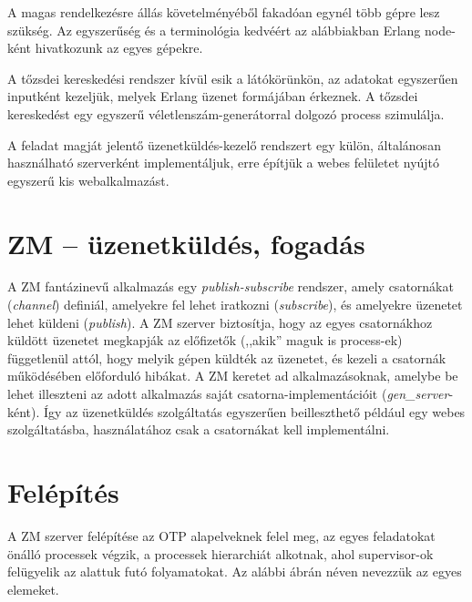 \documentclass[12pt, a4paper, oneside]{book}
\begin{document}
A magas rendelkezésre állás követelményéből fakadóan egynél több gépre lesz
szükség. Az egyszerűség és a terminológia kedvéért az alábbiakban Erlang
node-ként hivatkozunk az egyes gépekre.

A tőzsdei kereskedési rendszer kívül esik a látókörünkön, az adatokat
egyszerűen inputként kezeljük, melyek Erlang üzenet formájában érkeznek. A
tőzsdei kereskedést egy egyszerű véletlenszám-generátorral dolgozó process
szimulálja.

A feladat magját jelentő üzenetküldés-kezelő rendszert egy külön, általánosan
használható szerverként implementáljuk, erre építjük a webes felületet nyújtó
egyszerű kis webalkalmazást.

\section{ZM -- üzenetküldés, fogadás}
A ZM fantázinevű alkalmazás egy \emph{publish-subscribe} rendszer, amely
csatornákat (\emph{channel}) definiál, amelyekre fel lehet iratkozni
(\emph{subscribe}), és amelyekre üzenetet lehet küldeni (\emph{publish}). A ZM
szerver biztosítja, hogy az egyes csatornákhoz küldött üzenetet megkapják az
előfizetők (,,akik'' maguk is process-ek) függetlenül attól, hogy melyik gépen
küldték az üzenetet, és kezeli a csatornák működésében előforduló hibákat. A ZM
keretet ad alkalmazásoknak, amelybe be lehet illeszteni az adott alkalmazás
saját csatorna-implementációit (\emph{gen\_server}-ként). Így az üzenetküldés
szolgáltatás egyszerűen beilleszthető például egy webes szolgáltatásba,
használatához csak a csatornákat kell implementálni.

\section{Felépítés}
A ZM szerver felépítése az OTP alapelveknek felel meg, az egyes feladatokat
önálló processek végzik, a processek hierarchiát alkotnak, ahol
supervisor-ok felügyelik az alattuk futó folyamatokat. Az alábbi ábrán néven
nevezzük az egyes elemeket.
\end{document}

